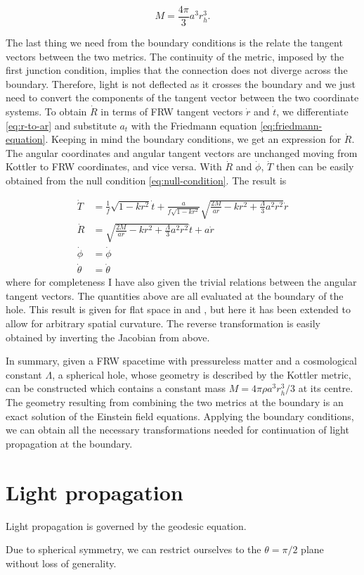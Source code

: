 \begin{equation}
  M = \frac{4\pi}{3} a^3 r_h^3. 
  \label{eq:junction-conditions-mass-volume}
\end{equation}

The last thing we need from the boundary conditions is the relate the tangent vectors between the two metrics. The continuity of the metric, imposed by the first junction condition, implies that the connection does not diverge across the boundary. Therefore, light is not deflected as it crosses the boundary and we just need to convert the components of the tangent vector between the two coordinate systems. To obtain $\dot{R}$ in terms of FRW tangent vectors $\dot{r}$ and $\dot{t}$, we differentiate \autoref{eq:r-to-ar} and substitute $a_t$ with the Friedmann equation \autoref{eq:friedmann-equation}. Keeping in mind the boundary conditions, we get an expression for $\dot{R}$. The angular coordinates and angular tangent vectors are unchanged moving from Kottler to FRW coordinates, and vice versa. With $\dot{R}$ and $\dot{\phi}$, $\dot{T}$ then can be easily obtained from the null condition \autoref{eq:null-condition}. The result is

\begin{subequations}
  \begin{align}
    \dot{T} &= \frac{1}{f}\sqrt{1-kr^2} \dot{t} + \frac{a}{f\sqrt{1-kr^2}} \sqrt{\frac{2M}{ar} - kr^2 + \frac{\Lambda}{3}a^2 r^2} \dot{r} \\
    \dot{R} &= \sqrt{\frac{2M}{ar} - kr^2 + \frac{\Lambda}{3}a^2 r^2} \dot{t} + a\dot{r}\\
    \dot{\phi} &= \dot{\phi}\\
    \dot{\theta} &= \dot{\theta}
  \end{align}
  \label{eq:kottler-to-frw-transform}
\end{subequations}
where for completeness I have also given the trivial relations between the angular tangent vectors. The quantities above are all evaluated at the boundary of the hole. This result is given for flat space in \citet{fleury2013interpretation} and \citet{schucker2009strong}, but here it has been extended to allow for arbitrary spatial curvature. The reverse transformation is easily obtained by inverting the Jacobian from above. 

In summary, given a FRW spacetime with pressureless matter and a cosmological constant $\Lambda$, a spherical hole, whose geometry is described by the Kottler metric, can be constructed which contains a constant mass $M = 4\pi \rho a^3 r_h^3/3$ at its centre. The geometry resulting from combining the two metrics at the boundary is an exact solution of the Einstein field equations. Applying the boundary conditions, we can obtain all the necessary transformations needed for continuation of light propagation at the boundary. 

\section{Light propagation}

Light propagation is governed by the geodesic equation. 

Due to spherical symmetry, we can restrict ourselves to the $\theta = \pi/2$ plane without loss of generality. 